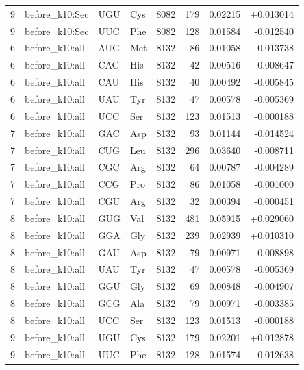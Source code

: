 \begin{longtable}{r l l l r r r r}
9 & before\_k10:Sec & UGU & Cys & 8082 & 179 & 0.02215 & +0.013014 \\
9 & before\_k10:Sec & UUC & Phe & 8082 & 128 & 0.01584 & -0.012540 \\
6 & before\_k10:all & AUG & Met & 8132 & 86 & 0.01058 & -0.013738 \\
6 & before\_k10:all & CAC & His & 8132 & 42 & 0.00516 & -0.008647 \\
6 & before\_k10:all & CAU & His & 8132 & 40 & 0.00492 & -0.005845 \\
6 & before\_k10:all & UAU & Tyr & 8132 & 47 & 0.00578 & -0.005369 \\
6 & before\_k10:all & UCC & Ser & 8132 & 123 & 0.01513 & -0.000188 \\
7 & before\_k10:all & GAC & Asp & 8132 & 93 & 0.01144 & -0.014524 \\
7 & before\_k10:all & CUG & Leu & 8132 & 296 & 0.03640 & -0.008711 \\
7 & before\_k10:all & CGC & Arg & 8132 & 64 & 0.00787 & -0.004289 \\
7 & before\_k10:all & CCG & Pro & 8132 & 86 & 0.01058 & -0.001000 \\
7 & before\_k10:all & CGU & Arg & 8132 & 32 & 0.00394 & -0.000451 \\
8 & before\_k10:all & GUG & Val & 8132 & 481 & 0.05915 & +0.029060 \\
8 & before\_k10:all & GGA & Gly & 8132 & 239 & 0.02939 & +0.010310 \\
8 & before\_k10:all & GAU & Asp & 8132 & 79 & 0.00971 & -0.008898 \\
8 & before\_k10:all & UAU & Tyr & 8132 & 47 & 0.00578 & -0.005369 \\
8 & before\_k10:all & GGU & Gly & 8132 & 69 & 0.00848 & -0.004907 \\
8 & before\_k10:all & GCG & Ala & 8132 & 79 & 0.00971 & -0.003385 \\
8 & before\_k10:all & UCC & Ser & 8132 & 123 & 0.01513 & -0.000188 \\
9 & before\_k10:all & UGU & Cys & 8132 & 179 & 0.02201 & +0.012878 \\
9 & before\_k10:all & UUC & Phe & 8132 & 128 & 0.01574 & -0.012638 \\
\bottomrule
\end{longtable}
\endgroup

